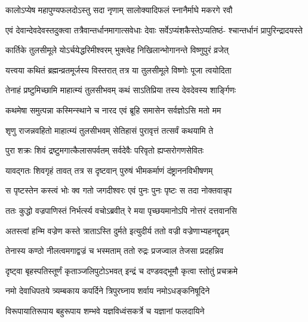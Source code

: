 \twolineshloka
{कालोऽप्येष महापुण्यफलदोऽस्तु सदा नृणाम्}
{सालोक्यादिफलं स्नानैर्माघे मकरगे रवौ} %

\fourlineindentedshloka
{एवं देवान्देवदेवस्तदुक्त्वा}
{तत्रैवान्तर्धानमागात्सवेधाः}
{देवाः सर्वेऽप्यंशकैस्तेऽप्यतिष्ठं-}
{श्चान्तर्धानं प्रापुरिन्द्रादयस्ते} %

\twolineshloka
{कार्तिके तुलसीमूले योऽर्चयेद्धरिमीश्वरम्}
{भुक्त्वेह निखिलान्भोगानन्ते विष्णुपुरं व्रजेत्} %





\twolineshloka
{यत्त्वया कथितं ब्रह्मन्व्रतमूर्जस्य विस्तरात्}
{तत्र या तुलसीमूले विष्णोः पूजा त्वयोदिता} %

\twolineshloka
{तेनाहं प्रष्टुमिच्छामि माहात्म्यं तुलसीभवम्}
{कथं साऽतिप्रिया तस्य देवदेवस्य शार्ङ्गिणः} %

\twolineshloka
{कथमेषा समुत्पन्ना कस्मिन्स्थाने च नारद}
{एवं ब्रूहि समासेन सर्वज्ञोऽसि मतो मम} %


\twolineshloka
{शृणु राजन्नवहितो माहात्म्यं तुलसीभवम्}
{सेतिहासं पुरावृत्तं तत्सर्वं कथयामि ते} %

\twolineshloka
{पुरा शक्रः शिवं द्रष्टुमगात्कैलासपर्वतम्}
{सर्वदेवैः परिवृतो ह्यप्सरोगणसेवितः} %

\twolineshloka
{यावद्गतः शिवगृहं तावत् तत्र स दृष्टवान्}
{पुरुषं भीमकर्माणं दंष्ट्राननविभीषणम्} %

\twolineshloka
{स पृष्टस्तेन कस्त्वं भोः क्व गतो जगदीश्वरः}
{एवं पुनः पुनः पृष्टः स तदा नोक्तवान्नृप} %

\twolineshloka
{ततः कुद्धो वज्रपाणिस्तं निर्भर्त्स्य वचोऽब्रवीत्}
{रे मया पृच्छयमानोऽपि नोत्तरं दत्तवानसि} %

\twolineshloka
{अतस्त्वां हन्मि वज्रेण कस्ते त्राताऽस्ति दुर्मते}
{इत्युदीर्य ततो वज्री वज्रेणाभ्यहनद्दृढम्} %

\twolineshloka
{तेनास्य कण्ठो नीलत्वमगाद्वज्रं च भस्मताम्}
{ततो रुद्रः प्रजज्वाल तेजसा प्रदहन्निव} %

\twolineshloka
{दृष्ट्वा बृहस्पतिस्तूर्णं कृताञ्जलिपुटोऽभवत्}
{इन्द्रं च दण्डवद्भूमौ कृत्वा स्तोतुं प्रचक्रमे} %


\twolineshloka
{नमो देवाधिपतये त्र्यम्बकाय कपर्दिने}
{त्रिपुरघ्नाय शर्वाय नमोऽधङ्कनिषूदिने} %

\twolineshloka
{विरूपायातिरूपाय बहुरूपाय शम्भवे}
{यज्ञविध्वंसकर्त्रे च यज्ञानां फलदायिने} %

